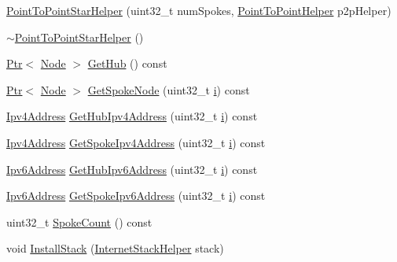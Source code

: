 \begin{DoxyCompactItemize}
\item 
\hyperlink{classns3_1_1PointToPointStarHelper_a76eb669e95427a51d46bfe314b760953}{Point\+To\+Point\+Star\+Helper} (uint32\+\_\+t num\+Spokes, \hyperlink{classns3_1_1PointToPointHelper}{Point\+To\+Point\+Helper} p2p\+Helper)
\item 
\hyperlink{classns3_1_1PointToPointStarHelper_a94f01ef0639995733bedad2b7e96ff8c}{$\sim$\+Point\+To\+Point\+Star\+Helper} ()
\item 
\hyperlink{classns3_1_1Ptr}{Ptr}$<$ \hyperlink{classns3_1_1Node}{Node} $>$ \hyperlink{classns3_1_1PointToPointStarHelper_a1015d39faae184c9722a6d16e7520bb8}{Get\+Hub} () const 
\item 
\hyperlink{classns3_1_1Ptr}{Ptr}$<$ \hyperlink{classns3_1_1Node}{Node} $>$ \hyperlink{classns3_1_1PointToPointStarHelper_ae7f0f6e9c70abc24983cc2b060235ede}{Get\+Spoke\+Node} (uint32\+\_\+t \hyperlink{lte__uplink__power__control_8m_a6f6ccfcf58b31cb6412107d9d5281426}{i}) const 
\item 
\hyperlink{classns3_1_1Ipv4Address}{Ipv4\+Address} \hyperlink{classns3_1_1PointToPointStarHelper_a4021efe8b39f277ab5d216277913b84a}{Get\+Hub\+Ipv4\+Address} (uint32\+\_\+t \hyperlink{lte__uplink__power__control_8m_a6f6ccfcf58b31cb6412107d9d5281426}{i}) const 
\item 
\hyperlink{classns3_1_1Ipv4Address}{Ipv4\+Address} \hyperlink{classns3_1_1PointToPointStarHelper_ab48d9a11854b6a58eac2e1da32663836}{Get\+Spoke\+Ipv4\+Address} (uint32\+\_\+t \hyperlink{lte__uplink__power__control_8m_a6f6ccfcf58b31cb6412107d9d5281426}{i}) const 
\item 
\hyperlink{classns3_1_1Ipv6Address}{Ipv6\+Address} \hyperlink{classns3_1_1PointToPointStarHelper_aaae70fa98164e788746c4db4e823b1d8}{Get\+Hub\+Ipv6\+Address} (uint32\+\_\+t \hyperlink{lte__uplink__power__control_8m_a6f6ccfcf58b31cb6412107d9d5281426}{i}) const 
\item 
\hyperlink{classns3_1_1Ipv6Address}{Ipv6\+Address} \hyperlink{classns3_1_1PointToPointStarHelper_a8c898cd8fd3766a5ba25617da5f174c2}{Get\+Spoke\+Ipv6\+Address} (uint32\+\_\+t \hyperlink{lte__uplink__power__control_8m_a6f6ccfcf58b31cb6412107d9d5281426}{i}) const 
\item 
uint32\+\_\+t \hyperlink{classns3_1_1PointToPointStarHelper_a5aa86766a75842eab19ab25ddd0af7b2}{Spoke\+Count} () const 
\item 
void \hyperlink{classns3_1_1PointToPointStarHelper_a3f20b73dea7d02b8594935ac3a656127}{Install\+Stack} (\hyperlink{classns3_1_1InternetStackHelper}{Internet\+Stack\+Helper} stack)

\end{DoxyCompactItemize}
